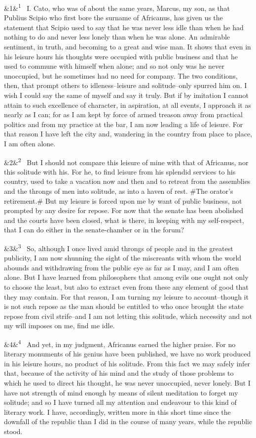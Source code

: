 \documentclass[12pt]{article}
\newcommand{\para}[1][]{\par\noindent\ifx&#1&\else\textsuperscript{\footnotesize #1}~\fi}
\begin{document}
\para[1] I. Cato, who was of about the same years, Marcus, my son, as that Publius Scipio who first bore the surname of Africanus, has given us the statement that Scipio used to say that he was never less idle than when he had nothing to do and never less lonely than when he was alone. An admirable sentiment, in truth, and becoming to a great and wise man. It shows that even in his leisure hours his thoughts were occupied with public business and that he used to commune with himself when alone; and so not only was he never unoccupied, but he sometimes had no need for company. The two conditions, then, that prompt others to idleness--leisure and solitude--only spurred him on. I wish I could say the same of myself and say it truly. But if by imitation I cannot attain to such excellence of character, in aspiration, at all events, I approach it as nearly as I can; for as I am kept by force of armed treason away from practical politics and from my practice at the bar, I am now leading a life of leisure. For that reason I have left the city and, wandering in the country from place to place, I am often alone.

\para[2] But I should not compare this leisure of mine with that of Africanus, nor this solitude with his. For he, to find leisure from his splendid services to his country, used to take a vacation now and then and to retreat from the assemblies and the throngs of men into solitude, as into a haven of rest. \#The orator's retirement.\# But my leisure is forced upon me by want of public business, not prompted by any desire for repose. For now that the senate has been abolished and the courts have been closed, what is there, in keeping with my self-respect, that I can do either in the senate-chamber or in the forum?

\para[3] So, although I once lived amid throngs of people and in the greatest publicity, I am now shunning the sight of the miscreants with whom the world abounds and withdrawing from the public eye as far as I may, and I am often alone. But I have learned from philosophers that among evils one ought not only to choose the least, but also to extract even from these any element of good that they may contain. For that reason, I am turning my leisure to account--though it is not such repose as the man should be entitled to who once brought the state repose from civil strife--and I am not letting this solitude, which necessity and not my will imposes on me, find me idle.

\para[4] And yet, in my judgment, Africanus earned the higher praise. For no literary monuments of his genius have been published, we have no work produced in his leisure hours, no product of his solitude. From this fact we may safely infer that, because of the activity of his mind and the study of those problems to which he used to direct his thought, he was never unoccupied, never lonely. But I have not strength of mind enough by means of silent meditation to forget my solitude; and so I have turned all my attention and endeavour to this kind of literary work. I have, accordingly, written more in this short time since the downfall of the republic than I did in the course of many years, while the republic stood.
\end{document}
